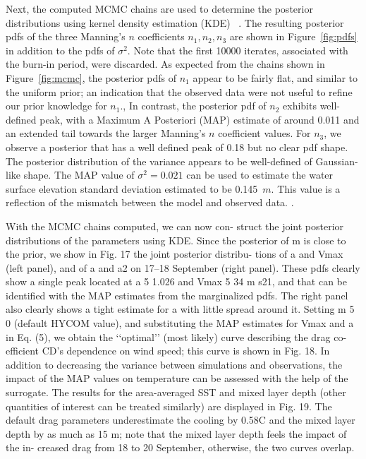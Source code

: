 Next, the computed MCMC chains are used to determine the posterior 
distributions using kernel density estimation (KDE)
~\citep{Parzen1962,Silverman1986}.  The resulting posterior pdfs 
of the three Manning's $n$ coefficients $n_1,n_2,n_3$ are shown 
in Figure~\ref{fig:pdfs} in addition to the pdfs of $\sigma^2$. 
Note that the first 10000 iterates, associated with the burn-in period, were discarded.  
As expected from the chains shown in Figure~\ref{fig:mcmc}, the posterior pdfs of $n_1$ appear to be fairly flat, 
and similar to the uniform prior; an indication that 
the observed data were not useful to refine our prior knowledge for $n_1$.,
In contrast, the posterior pdf of $n_2$ exhibits well-defined peak, 
with a Maximum A Posteriori (MAP) estimate of around 0.011
and an extended tail towards the larger Manning's $n$ coefficient values.
For $n_3$, we observe a posterior that has a well defined peak
of 0.18 but no clear pdf shape. The posterior distribution of the variance 
appears to be well-defined of Gaussian-like shape. 
The MAP value of $\sigma^2=0.021$ can be used to estimate the water surface elevation standard 
deviation estimated to be 0.145~$m$. This value is a reflection of the mismatch between the model and 
observed data. .

With the MCMC chains computed, we can now con- struct the joint posterior distributions of the parameters
using KDE. Since the posterior of m is close to the prior, we show in Fig. 17 the joint posterior distribu- tions of a and Vmax (left panel), and of a and a2 on 17–18 September (right panel). These pdfs clearly show a single peak located at a 5 1.026 and Vmax 5 34 m s21, and that can be identified with the MAP estimates from the marginalized pdfs. The right panel also clearly shows a tight estimate for a with little spread around it. Setting m 5 0 (default HYCOM value), and substituting the MAP estimates for Vmax and a in Eq. (5), we obtain the ‘‘optimal’’ (most likely) curve describing the drag co- efficient CD’s dependence on wind speed; this curve is shown in Fig. 18. In addition to decreasing the variance between simulations and observations, the impact of the MAP values on temperature can be assessed with the help of the surrogate. The results for the area-averaged SST and mixed layer depth (other quantities of interest can be treated similarly) are displayed in Fig. 19. The default drag parameters underestimate the cooling by 0.58C and the mixed layer depth by as much as 15 m; note that the mixed layer depth feels the impact of the in- creased drag from 18 to 20 September, otherwise, the two curves overlap.



